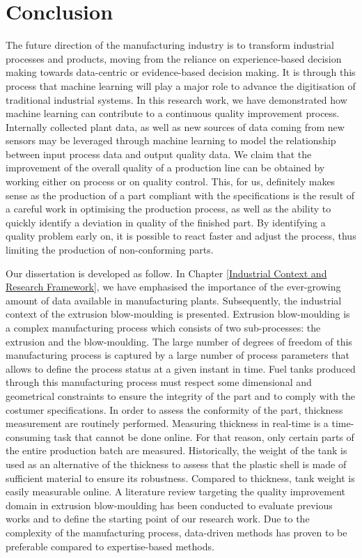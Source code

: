 \chapter*{Conclusion}

The future direction of the manufacturing industry is to transform industrial processes and products, moving from the reliance on experience-based decision making towards data-centric or evidence-based decision making. It is through this process that machine learning will play a major role to advance the digitisation of traditional industrial systems. In this research work, we have demonstrated how machine learning can contribute to a continuous quality improvement process. Internally collected plant data, as well as new sources of data coming from new sensors may be leveraged through machine learning to model the relationship between input process data and output quality data. We claim that the improvement of the overall quality of a production line can be obtained by working either on process or on quality control. This, for us, definitely makes sense as the production of a part compliant with the specifications is the result of a careful work in optimising the production process, as well as the ability to quickly identify a deviation in quality of the finished part. By identifying a quality problem early on, it is possible to react faster and adjust the process, thus limiting the production of non-conforming parts.

Our dissertation is developed as follow. In Chapter \ref{Industrial Context and Research Framework}, we have emphasised the importance of the ever-growing amount of data available in manufacturing plants. Subsequently, the industrial context of the extrusion blow-moulding is presented. Extrusion blow-moulding is a complex manufacturing process which consists of two sub-processes: the extrusion and the blow-moulding. The large number of degrees of freedom of this manufacturing process is captured by a large number of process parameters that allows to define the process status at a given instant in time. Fuel tanks produced through this manufacturing process must respect some dimensional and geometrical constraints to ensure the integrity of the part and to comply with the costumer specifications. In order to assess the conformity of the part, thickness measurement are routinely performed. Measuring thickness in real-time is a time-consuming task that cannot be done online. For that reason, only certain parts of the entire production batch are measured. Historically, the weight of the tank is used as an alternative of the thickness to assess that the plastic shell is made of sufficient material to ensure its robustness. Compared to thickness, tank weight is easily measurable online. A literature review targeting the quality improvement domain in extrusion blow-moulding has been conducted to evaluate previous works and to define the starting point of our research work. Due to the complexity of the manufacturing process, data-driven methods has proven to be preferable compared to expertise-based methods. 

